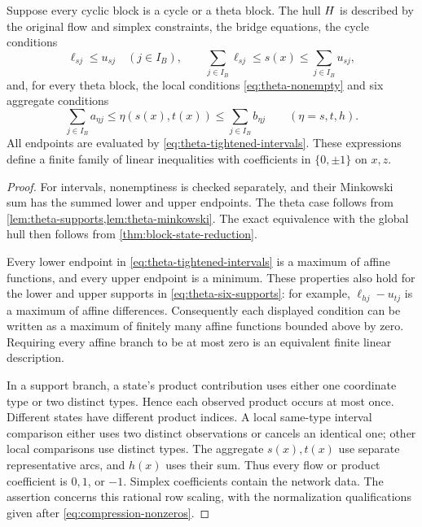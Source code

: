 \begin{theorem}\label{thm:theta-hull}
Suppose every cyclic block is a cycle or a theta block. The hull $H$
is described by the original flow and simplex constraints, the bridge
equations, the cycle conditions
\begin{equation}\label{eq:cycle-hull}
 \ell_{sj}\le u_{sj}\quad(j\in I_B),\qquad
 \sum_{j\in I_B}\ell_{sj}\le s(x)\le\sum_{j\in I_B}u_{sj},
\end{equation}
and, for every theta block, the local conditions
\eqref{eq:theta-nonempty} and six aggregate conditions
\begin{equation}\label{eq:theta-aggregate}
 \sum_{j\in I_B}a_{\eta j}\le\eta(s(x),t(x))
                   \le\sum_{j\in I_B}b_{\eta j}\qquad(\eta=s,t,h).
\end{equation}
All endpoints are evaluated by \eqref{eq:theta-tightened-intervals}.
These expressions define a finite family of linear inequalities with
coefficients in $\{0,\pm1\}$ on $x,z$.
\end{theorem}
\begin{proof}
For intervals, nonemptiness is checked separately, and their Minkowski
sum has the summed lower and upper endpoints. The theta case follows
from \cref{lem:theta-supports,lem:theta-minkowski}. The exact equivalence
with the global hull then follows from
\cref{thm:block-state-reduction}.

Every lower endpoint in \eqref{eq:theta-tightened-intervals} is a maximum
of affine functions, and every upper endpoint is a minimum. These
properties also hold for the lower and upper supports in
\eqref{eq:theta-six-supports}: for example,
$\ell_{hj}-u_{tj}$ is a maximum of affine differences. Consequently
each displayed condition can be written as a maximum of finitely many
affine functions bounded above by zero. Requiring every affine branch
to be at most zero is an equivalent finite linear description.

In a support branch, a state's product contribution uses either one
coordinate type or two distinct types. Hence each observed product occurs
at most once. Different states have different product indices. A local
same-type interval comparison either uses two distinct observations or
cancels an identical one; other local comparisons use distinct types.
The aggregate $s(x),t(x)$ use separate representative arcs, and $h(x)$
uses their sum. Thus every flow or product coefficient is $0,1$, or
$-1$. Simplex coefficients contain the network data. The assertion
concerns this rational row scaling, with the normalization qualifications
given after \eqref{eq:compression-nonzeros}.
\end{proof}


